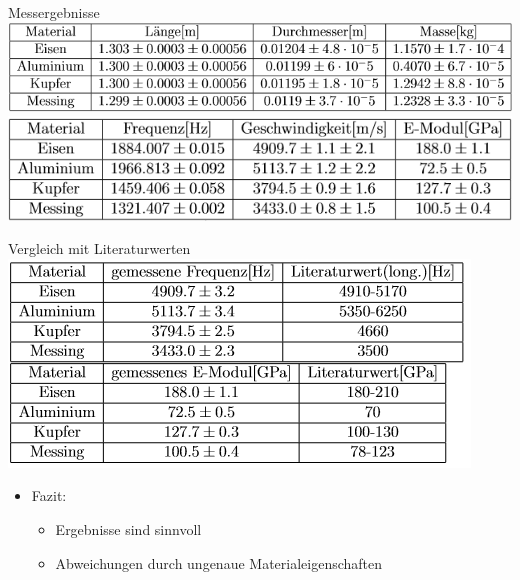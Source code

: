 \documentclass[12pt]{beamer}
\begin{document}
\begin{frame}{Messergebnisse}
\includegraphics[width=\linewidth,height=\textheight,keepaspectratio]{Bilder/Material_Metalle.PNG}\\
\includegraphics[width=\linewidth,height=\textheight,keepaspectratio]{Bilder/Ergebnisse_Metall.PNG}
\end{frame}

\begin{frame}{Vergleich mit Literaturwerten}
\includegraphics[width=\linewidth,height=\textheight,keepaspectratio]{Bilder/Literaturwerte_Metalle.PNG}\\
\begin{itemize}
\item Fazit:
\begin{itemize}
\item Ergebnisse sind sinnvoll
\item Abweichungen durch ungenaue Materialeigenschaften
\end{itemize}
\end{itemize}
\end{frame}
\end{document}
